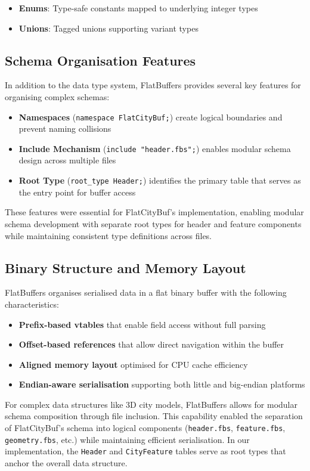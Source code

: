 \begin{itemize}
  \item \textbf{Enums}: Type-safe constants mapped to underlying integer types
  \item \textbf{Unions}: Tagged unions supporting variant types
\end{itemize}

\subsection{Schema Organisation Features}
\label{rw_tb:fb:schema_organisation}

In addition to the data type system, FlatBuffers provides several key features for organising complex schemas:

\begin{itemize}
  \item \textbf{Namespaces} (\texttt{namespace FlatCityBuf;}) create logical boundaries and prevent naming collisions

  \item \textbf{Include Mechanism} (\texttt{include "header.fbs";}) enables modular schema design across multiple files

  \item \textbf{Root Type} (\texttt{root\_type Header;}) identifies the primary table that serves as the entry point for buffer access
\end{itemize}

These features were essential for FlatCityBuf's implementation, enabling modular schema development with separate root types for header and feature components while maintaining consistent type definitions across files.

\subsection{Binary Structure and Memory Layout}
\label{rw_tb:fb:binary_structure}

FlatBuffers organises serialised data in a flat binary buffer with the following characteristics:

\begin{itemize}
    \item \textbf{Prefix-based vtables} that enable field access without full parsing
    \item \textbf{Offset-based references} that allow direct navigation within the buffer
    \item \textbf{Aligned memory layout} optimised for CPU cache efficiency
    \item \textbf{Endian-aware serialisation} supporting both little and big-endian platforms
\end{itemize}

For complex data structures like 3D city models, FlatBuffers allows for modular schema composition through file inclusion. This capability enabled the separation of FlatCityBuf's schema into logical components (\texttt{header.fbs}, \texttt{feature.fbs}, \texttt{geometry.fbs}, etc.) while maintaining efficient serialisation. In our implementation, the \texttt{Header} and \texttt{CityFeature} tables serve as root types that anchor the overall data structure.
